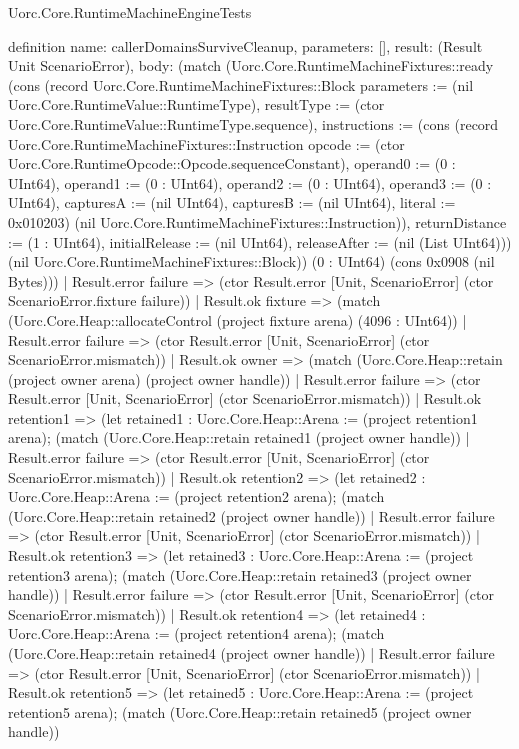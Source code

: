 \begin{lexlean}{Uorc.Core.RuntimeMachineEngineTests}
\begin{semanticmodule}
definition{
  name: callerDomainsSurviveCleanup,
  parameters: [],
  result: (Result Unit ScenarioError),
  body: (match (Uorc.Core.RuntimeMachineFixtures::ready (cons (record Uorc.Core.RuntimeMachineFixtures::Block {parameters := (nil Uorc.Core.RuntimeValue::RuntimeType), resultType := (ctor Uorc.Core.RuntimeValue::RuntimeType.sequence), instructions := (cons (record Uorc.Core.RuntimeMachineFixtures::Instruction {opcode := (ctor Uorc.Core.RuntimeOpcode::Opcode.sequenceConstant), operand0 := (0 : UInt64), operand1 := (0 : UInt64), operand2 := (0 : UInt64), operand3 := (0 : UInt64), capturesA := (nil UInt64), capturesB := (nil UInt64), literal := 0x010203}) (nil Uorc.Core.RuntimeMachineFixtures::Instruction)), returnDistance := (1 : UInt64), initialRelease := (nil UInt64), releaseAfter := (nil (List UInt64))}) (nil Uorc.Core.RuntimeMachineFixtures::Block)) (0 : UInt64) (cons 0x0908 (nil Bytes)))
    | Result.error failure => (ctor Result.error [Unit, ScenarioError] (ctor ScenarioError.fixture failure))
    | Result.ok fixture => (match (Uorc.Core.Heap::allocateControl (project fixture arena) (4096 : UInt64))
      | Result.error failure => (ctor Result.error [Unit, ScenarioError] (ctor ScenarioError.mismatch))
      | Result.ok owner => (match (Uorc.Core.Heap::retain (project owner arena) (project owner handle))
        | Result.error failure => (ctor Result.error [Unit, ScenarioError] (ctor ScenarioError.mismatch))
        | Result.ok retention1 => (let retained1 : Uorc.Core.Heap::Arena := (project retention1 arena); (match (Uorc.Core.Heap::retain retained1 (project owner handle))
          | Result.error failure => (ctor Result.error [Unit, ScenarioError] (ctor ScenarioError.mismatch))
          | Result.ok retention2 => (let retained2 : Uorc.Core.Heap::Arena := (project retention2 arena); (match (Uorc.Core.Heap::retain retained2 (project owner handle))
            | Result.error failure => (ctor Result.error [Unit, ScenarioError] (ctor ScenarioError.mismatch))
            | Result.ok retention3 => (let retained3 : Uorc.Core.Heap::Arena := (project retention3 arena); (match (Uorc.Core.Heap::retain retained3 (project owner handle))
              | Result.error failure => (ctor Result.error [Unit, ScenarioError] (ctor ScenarioError.mismatch))
              | Result.ok retention4 => (let retained4 : Uorc.Core.Heap::Arena := (project retention4 arena); (match (Uorc.Core.Heap::retain retained4 (project owner handle))
                | Result.error failure => (ctor Result.error [Unit, ScenarioError] (ctor ScenarioError.mismatch))
                | Result.ok retention5 => (let retained5 : Uorc.Core.Heap::Arena := (project retention5 arena); (match (Uorc.Core.Heap::retain retained5 (project owner handle))
}
\end{semanticmodule}
\end{lexlean}
